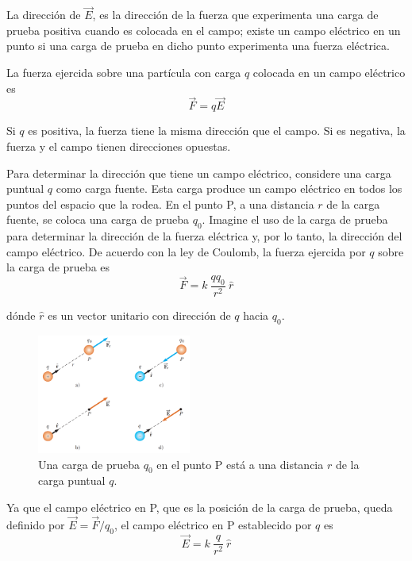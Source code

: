     \VS
    \PN La dirección de $\vec{E}$, es la dirección de la fuerza que experimenta una carga de prueba positiva cuando es
    colocada en el campo; existe un campo eléctrico en un punto si una carga de prueba en dicho punto experimenta una
    fuerza eléctrica.

    \VS
    \PN La fuerza ejercida sobre una partícula con carga $q$ colocada en un campo eléctrico es
    \begin{equation*}
      \vec{F} = q \vec{E}
    \end{equation*}

    \PN Si $q$ es positiva, la fuerza tiene la misma dirección que el campo. Si es negativa, la fuerza y el campo tienen
    direcciones opuestas.

    \VS
    \PN Para determinar la dirección que tiene un campo eléctrico, considere una carga puntual $q$ como carga fuente.
    Esta carga produce un campo eléctrico en todos los puntos del espacio que la rodea. En el punto P, a una distancia
    $r$ de la carga fuente, se coloca una carga de prueba $q_{0}$. Imagine el uso de la carga de prueba para determinar
    la dirección de la fuerza eléctrica y, por lo tanto, la dirección del campo eléctrico. De acuerdo con la ley de
    Coulomb, la fuerza ejercida por $q$ sobre la carga de prueba es
    \begin{equation*}
      \vec{F} = k \ \frac{q q_{0}}{r^{2}} \ \hat{r}
    \end{equation*}

    \PN dónde $\hat{r}$ es un vector unitario con dirección de $q$ hacia $q_{0}$.

    \begin{figure}[H]
    \centering
      \includegraphics[width=0.45\textwidth]{4/figure_2}
      \caption{Una carga de prueba $q_{0}$ en el punto P está a una distancia $r$ de la carga puntual $q$.}
    \end{figure}

    \PN Ya que el campo eléctrico en P, que es la posición de la carga de prueba, queda definido por $\vec{E} = \vec{F}
    / q_{0}$, el campo eléctrico en P establecido por $q$ es
    \begin{equation*}
      \vec{E} = k \ \frac{q}{r^{2}} \ \hat{r}
    \end{equation*}

